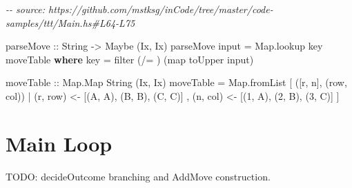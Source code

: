 \documentclass[]{article}
\newenvironment{Shaded}{}{}
\newcommand{\CharTok}[1]{\textcolor[rgb]{0.25,0.44,0.63}{#1}}
\newcommand{\CommentTok}[1]{\textcolor[rgb]{0.38,0.63,0.69}{\textit{#1}}}
\newcommand{\DataTypeTok}[1]{\textcolor[rgb]{0.56,0.13,0.00}{#1}}
\newcommand{\FunctionTok}[1]{\textcolor[rgb]{0.02,0.16,0.49}{#1}}
\newcommand{\KeywordTok}[1]{\textcolor[rgb]{0.00,0.44,0.13}{\textbf{#1}}}
\newcommand{\NormalTok}[1]{#1}
\newcommand{\OperatorTok}[1]{\textcolor[rgb]{0.40,0.40,0.40}{#1}}
\newcommand{\OtherTok}[1]{\textcolor[rgb]{0.00,0.44,0.13}{#1}}
\begin{document}
\begin{Shaded}
\begin{Highlighting}[]
\CommentTok{{-}{-} source: https://github.com/mstksg/inCode/tree/master/code{-}samples/ttt/Main.hs\#L64{-}L75}

\OtherTok{parseMove ::} \DataTypeTok{String} \OtherTok{{-}\textgreater{}} \DataTypeTok{Maybe}\NormalTok{ (}\DataTypeTok{Ix}\NormalTok{, }\DataTypeTok{Ix}\NormalTok{)}
\NormalTok{parseMove input }\OtherTok{=}\NormalTok{ Map.lookup key moveTable}
  \KeywordTok{where}
\NormalTok{    key }\OtherTok{=} \FunctionTok{filter}\NormalTok{ (}\OperatorTok{/=} \CharTok{\textquotesingle{} \textquotesingle{}}\NormalTok{) (}\FunctionTok{map} \FunctionTok{toUpper}\NormalTok{ input)}

\OtherTok{moveTable ::} \DataTypeTok{Map.Map} \DataTypeTok{String}\NormalTok{ (}\DataTypeTok{Ix}\NormalTok{, }\DataTypeTok{Ix}\NormalTok{)}
\NormalTok{moveTable }\OtherTok{=}
\NormalTok{    Map.fromList}
\NormalTok{        [ ([r, n], (row, col))}
        \OperatorTok{|}\NormalTok{ (r, row) }\OtherTok{\textless{}{-}}\NormalTok{ [(}\CharTok{\textquotesingle{}A\textquotesingle{}}\NormalTok{, }\DataTypeTok{A}\NormalTok{), (}\CharTok{\textquotesingle{}B\textquotesingle{}}\NormalTok{, }\DataTypeTok{B}\NormalTok{), (}\CharTok{\textquotesingle{}C\textquotesingle{}}\NormalTok{, }\DataTypeTok{C}\NormalTok{)]}
\NormalTok{        , (n, col) }\OtherTok{\textless{}{-}}\NormalTok{ [(}\CharTok{\textquotesingle{}1\textquotesingle{}}\NormalTok{, }\DataTypeTok{A}\NormalTok{), (}\CharTok{\textquotesingle{}2\textquotesingle{}}\NormalTok{, }\DataTypeTok{B}\NormalTok{), (}\CharTok{\textquotesingle{}3\textquotesingle{}}\NormalTok{, }\DataTypeTok{C}\NormalTok{)]}
\NormalTok{        ]}
\end{Highlighting}
\end{Shaded}

\section{Main Loop}\label{main-loop}

TODO: decideOutcome branching and AddMove construction.
\end{document}
